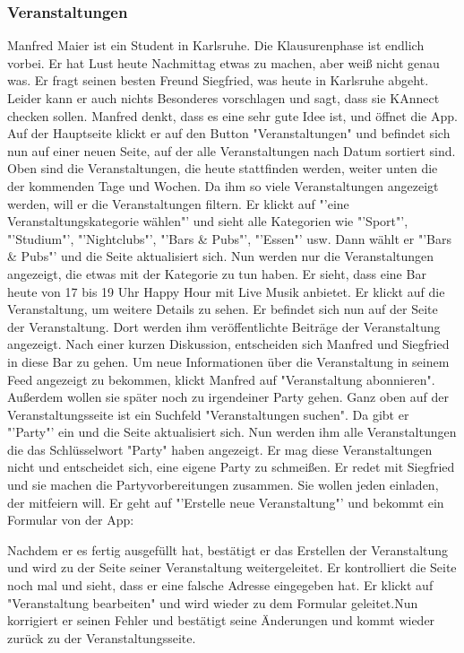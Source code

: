 \documentclass[parskip=full]{scrartcl}
\begin{document}
	\subsubsection{Veranstaltungen}
	Manfred Maier ist ein Student in Karlsruhe. Die Klausurenphase ist endlich vorbei. Er hat Lust heute Nachmittag etwas zu machen, aber weiß nicht genau was. Er fragt seinen besten Freund Siegfried, was heute in Karlsruhe abgeht. Leider kann er auch nichts Besonderes vorschlagen und sagt, dass sie KAnnect checken sollen. Manfred denkt, dass es eine sehr gute Idee ist, und öffnet die \gls{App}.
	Auf der Hauptseite klickt er auf den \gls{Button} "Veranstaltungen" und befindet sich nun auf einer neuen Seite, auf der alle Veranstaltungen nach Datum sortiert sind. Oben sind die Veranstaltungen, die heute stattfinden werden, weiter unten die der kommenden Tage und Wochen.
	Da ihm so viele Veranstaltungen angezeigt werden, will er die Veranstaltungen filtern. Er klickt auf "'eine Veranstaltungskategorie wählen"' und sieht alle \gls{Kategorie}n wie "'Sport"', "'Studium"', "'Nightclubs"', "'Bars \& Pubs"', "'Essen"' usw. 
	Dann wählt er "'Bars \& Pubs"' und die Seite aktualisiert sich. Nun werden nur die Veranstaltungen angezeigt, die etwas mit der \gls{Kategorie} zu tun haben.
	Er sieht, dass eine Bar heute von 17 bis 19 Uhr Happy Hour mit Live Musik anbietet. Er klickt auf die Veranstaltung, um weitere Details zu sehen. Er befindet sich nun auf der Seite der Veranstaltung. Dort werden ihm veröffentlichte Beiträge der Veranstaltung angezeigt. Nach einer kurzen Diskussion, entscheiden sich Manfred und Siegfried in diese Bar zu gehen. Um neue Informationen über die Veranstaltung in seinem \gls{Feed} angezeigt zu bekommen, klickt Manfred auf "Veranstaltung abonnieren". Außerdem wollen sie später noch zu irgendeiner Party gehen. Ganz oben auf der Veranstaltungsseite ist ein Suchfeld "Veranstaltungen suchen". Da gibt er "'Party"' ein und die Seite aktualisiert sich. Nun werden ihm alle Veranstaltungen die das Schlüsselwort "Party" haben angezeigt. Er mag diese Veranstaltungen nicht und entscheidet sich, eine eigene Party zu schmeißen. Er redet mit Siegfried und sie machen die Partyvorbereitungen zusammen. Sie wollen jeden einladen, der mitfeiern will. Er geht auf "'Erstelle neue Veranstaltung"' und bekommt ein Formular von der \gls{App}: 
	
	
	Nachdem er es fertig ausgefüllt hat, bestätigt er das Erstellen der Veranstaltung und wird zu der Seite seiner Veranstaltung weitergeleitet. Er kontrolliert die Seite noch mal und sieht, dass er eine falsche Adresse eingegeben hat. Er klickt auf "Veranstaltung bearbeiten" und wird wieder zu dem Formular geleitet.Nun korrigiert er seinen Fehler und bestätigt seine Änderungen und kommt wieder zurück zu der Veranstaltungsseite.
	
\end{document}
